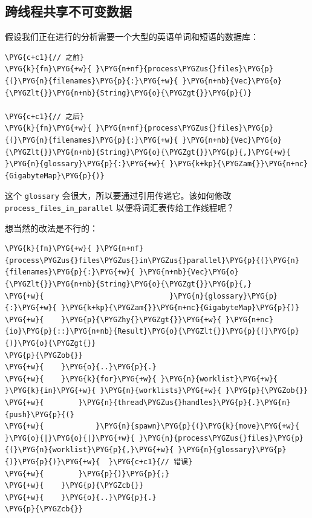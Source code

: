 \subsection{跨线程共享不可变数据}

假设我们正在进行的分析需要一个大型的英语单词和短语的数据库：

\begin{Verbatim}[commandchars=\\\{\},breaklines=true,breakanywhere=true,fontsize=\codefont,xleftmargin=17bp]
\PYG{c+c1}{// 之前}
\PYG{k}{fn}\PYG{+w}{ }\PYG{n+nf}{process\PYGZus{}files}\PYG{p}{(}\PYG{n}{filenames}\PYG{p}{:}\PYG{+w}{ }\PYG{n+nb}{Vec}\PYG{o}{\PYGZlt{}}\PYG{n+nb}{String}\PYG{o}{\PYGZgt{}}\PYG{p}{)}

\PYG{c+c1}{// 之后}
\PYG{k}{fn}\PYG{+w}{ }\PYG{n+nf}{process\PYGZus{}files}\PYG{p}{(}\PYG{n}{filenames}\PYG{p}{:}\PYG{+w}{ }\PYG{n+nb}{Vec}\PYG{o}{\PYGZlt{}}\PYG{n+nb}{String}\PYG{o}{\PYGZgt{}}\PYG{p}{,}\PYG{+w}{ }\PYG{n}{glossary}\PYG{p}{:}\PYG{+w}{ }\PYG{k+kp}{\PYGZam{}}\PYG{n+nc}{GigabyteMap}\PYG{p}{)}
\end{Verbatim}

这个 \texttt{glossary} 会很大，所以要通过引用传递它。该如何修改 \texttt{process\_files\_in\_parallel} 以便将词汇表传给工作线程呢？

想当然的改法是不行的：

\begin{Verbatim}[commandchars=\\\{\},breaklines=true,breakanywhere=true,fontsize=\codefont,xleftmargin=17bp]
\PYG{k}{fn}\PYG{+w}{ }\PYG{n+nf}{process\PYGZus{}files\PYGZus{}in\PYGZus{}parallel}\PYG{p}{(}\PYG{n}{filenames}\PYG{p}{:}\PYG{+w}{ }\PYG{n+nb}{Vec}\PYG{o}{\PYGZlt{}}\PYG{n+nb}{String}\PYG{o}{\PYGZgt{}}\PYG{p}{,}
\PYG{+w}{                             }\PYG{n}{glossary}\PYG{p}{:}\PYG{+w}{ }\PYG{k+kp}{\PYGZam{}}\PYG{n+nc}{GigabyteMap}\PYG{p}{)}
\PYG{+w}{    }\PYG{p}{\PYGZhy{}\PYGZgt{}}\PYG{+w}{ }\PYG{n+nc}{io}\PYG{p}{::}\PYG{n+nb}{Result}\PYG{o}{\PYGZlt{}}\PYG{p}{(}\PYG{p}{)}\PYG{o}{\PYGZgt{}}
\PYG{p}{\PYGZob{}}
\PYG{+w}{    }\PYG{o}{..}\PYG{p}{.}
\PYG{+w}{    }\PYG{k}{for}\PYG{+w}{ }\PYG{n}{worklist}\PYG{+w}{ }\PYG{k}{in}\PYG{+w}{ }\PYG{n}{worklists}\PYG{+w}{ }\PYG{p}{\PYGZob{}}
\PYG{+w}{        }\PYG{n}{thread\PYGZus{}handles}\PYG{p}{.}\PYG{n}{push}\PYG{p}{(}
\PYG{+w}{            }\PYG{n}{spawn}\PYG{p}{(}\PYG{k}{move}\PYG{+w}{ }\PYG{o}{|}\PYG{o}{|}\PYG{+w}{ }\PYG{n}{process\PYGZus{}files}\PYG{p}{(}\PYG{n}{worklist}\PYG{p}{,}\PYG{+w}{ }\PYG{n}{glossary}\PYG{p}{)}\PYG{p}{)}\PYG{+w}{  }\PYG{c+c1}{// 错误}
\PYG{+w}{        }\PYG{p}{)}\PYG{p}{;}
\PYG{+w}{    }\PYG{p}{\PYGZcb{}}
\PYG{+w}{    }\PYG{o}{..}\PYG{p}{.}
\PYG{p}{\PYGZcb{}}
\end{Verbatim}

